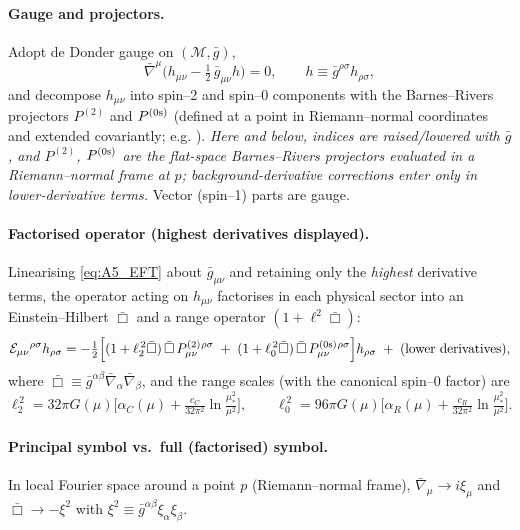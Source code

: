 \documentclass{iopjournal}
\begin{document}
\paragraph{Gauge and projectors.}
Adopt de Donder gauge on $(\mathcal M,\bar g)$,
\begin{equation}
\bar\nabla^\mu\Big(h_{\mu\nu}-\tfrac12\,\bar g_{\mu\nu}h\Big)=0,
\qquad h\equiv \bar g^{\rho\sigma}h_{\rho\sigma},
\label{eq:B1_DDG}
\end{equation}
and decompose $h_{\mu\nu}$ into spin–2 and spin–0 components with the Barnes–Rivers projectors $P^{(2)}$ and $P^{(0{\rm s})}$ (defined at a point in Riemann–normal coordinates and extended covariantly; e.g. \cite{Stelle1977,ParkerToms}). \emph{Here and below, indices are raised/lowered with $\bar g$, and $P^{(2)}$, $P^{(0{\rm s})}$ are the flat-space Barnes–Rivers projectors evaluated in a Riemann–normal frame at $p$; background-derivative corrections enter only in lower-derivative terms.} Vector (spin–1) parts are gauge.

\paragraph{Factorised operator (highest derivatives displayed).}
Linearising \eqref{eq:A5_EFT} about $\bar g_{\mu\nu}$ and retaining only the \emph{highest} derivative terms, the operator acting on $h_{\mu\nu}$ factorises in each physical sector into an Einstein–Hilbert $\bar\Box$ and a range operator $(1+\ell^2\bar\Box)$:
\begin{equation}
\mathcal{E}_{\mu\nu}{}^{\rho\sigma} h_{\rho\sigma}
=
-\tfrac12\Big[(1+\ell_2^{\,2}\bar\Box)\,\bar\Box\,P^{(2)}_{\mu\nu}{}^{\rho\sigma}
\;+\;
(1+\ell_0^{\,2}\bar\Box)\,\bar\Box\,P^{(0{\rm s})}_{\mu\nu}{}^{\rho\sigma}\Big]h_{\rho\sigma}
\;+\;\text{(lower derivatives)},
\label{eq:B1_factor}
\end{equation}
where $\bar\Box\equiv \bar g^{\alpha\beta}\bar\nabla_\alpha\bar\nabla_\beta$, and the range scales (with the canonical spin–0 factor) are
\begin{equation}
\ell_2^{\,2}=32\pi G(\mu)\Big[\alpha_C(\mu)+\tfrac{c_C}{32\pi^2}\ln\!\tfrac{\mu_*^2}{\mu^2}\Big],
\qquad
\ell_0^{\,2}=96\pi G(\mu)\Big[\alpha_R(\mu)+\tfrac{c_R}{32\pi^2}\ln\!\tfrac{\mu_*^2}{\mu^2}\Big].
\label{eq:B1_lengths_repeat}
\end{equation}

\paragraph{Principal symbol vs.\ full (factorised) symbol.}
In local Fourier space around a point $p$ (Riemann–normal frame), $\bar\nabla_\mu\!\to i\xi_\mu$ and $\bar\Box\to -\xi^2$ with $\xi^2\equiv \bar g^{\alpha\beta}\xi_\alpha\xi_\beta$.
\end{document}
